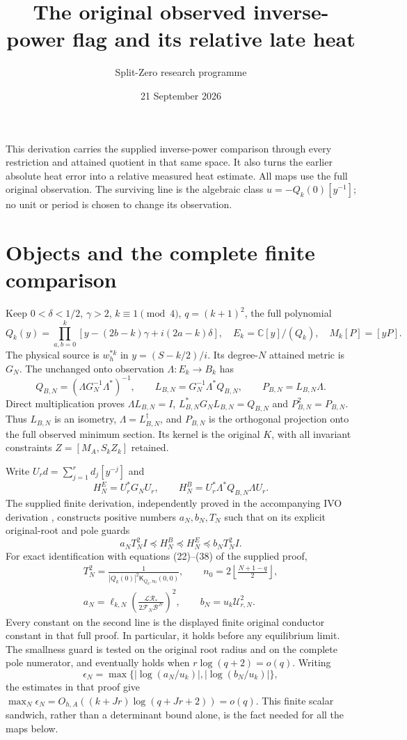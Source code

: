 \documentclass[11pt]{article}
\title{The original observed inverse-power flag and its relative late heat}
\author{Split-Zero research programme}\date{21 September 2026}
\begin{document}
\maketitle
This derivation carries the supplied inverse-power comparison through
every restriction and attained quotient in that same space. It also
turns the earlier absolute heat error into a relative measured heat
estimate. All maps use the full original observation. The surviving
line is the algebraic class $u=-Q_k(0)[y^{-1}]$; no unit or period is
chosen to change its observation.

\section{Objects and the complete finite comparison}
Keep $0<\delta<1/2$, $\gamma>2$, $k\equiv1\pmod4$,
$q=(k+1)^2$, the full polynomial
\[
Q_k(y)=\prod_{a,b=0}^{k}
[y-(2b-k)\gamma+i(2a-k)\delta],
\quad E_k=\mathbb C[y]/(Q_k),
\quad M_k[P]=[yP].
\]
The physical source is $w_h^{*k}$ in $y=(S-k/2)/i$.
Its degree-$N$ attained metric is $G_N$.
The unchanged onto observation $\Lambda:E_k\to B_k$ has
\[
Q_{B,N}=(\Lambda G_N^{-1}\Lambda^*)^{-1},\qquad
L_{B,N}=G_N^{-1}\Lambda^*Q_{B,N},\qquad
P_{B,N}=L_{B,N}\Lambda.
\tag{IFH1}
\]
Direct multiplication proves $\Lambda L_{B,N}=I$,
$L_{B,N}^*G_NL_{B,N}=Q_{B,N}$ and $P_{B,N}^2=P_{B,N}$.
Thus $L_{B,N}$ is an isometry, $\Lambda=L_{B,N}^\dagger$,
and $P_{B,N}$ is the orthogonal projection onto the full observed
minimum section. Its kernel is the original $K$, with all invariant
constraints $Z=[M_A,S_kZ_k]$ retained.

Write $U_rd=\sum_{j=1}^rd_j[y^{-j}]$ and
\[
H^E_N=U_r^*G_NU_r,\qquad
H^B_N=U_r^*\Lambda^*Q_{B,N}\Lambda U_r.
\]
The supplied finite derivation, independently proved in the accompanying
IVO derivation \cite{IVO}, constructs positive numbers $a_N,b_N,T_N$
such that on its explicit original-root and pole guards
\[
a_N T_N^2I\preceq H^B_N\preceq H^E_N
\preceq b_N T_N^2I .
\tag{IFH2}
\]
For exact identification with equations (22)--(38) of the supplied proof,
\[
\begin{gathered}
T_N^2=\frac1{|Q_k(0)|^2\mathsf K_{Q_k,n_0}(0,0)},\qquad
n_0=2\left\lfloor\frac{N+1-q}{2}\right\rfloor,\\
a_N=\ell_{k,N}
 \left(\frac{\mathcal L\mathcal R_*}
 {2\mathcal F_N\mathcal B^{Jr}}\right)^2,\qquad
b_N=u_k\mathcal U_{r,N}^2 .
\end{gathered}\tag{IFH3}
\]
Every constant on the second line is the displayed finite original
conductor constant in that full proof. In particular, it holds before
any equilibrium limit. The smallness guard is tested on the original
root radius and on the complete pole numerator, and eventually holds
when $r\log(q+2)=o(q)$.
Writing
\[
\epsilon_N=\max\{|\log(a_N/u_k)|,|\log(b_N/u_k)|\},
\]
the estimates in that proof give
$\max_N\epsilon_N=O_{h,A}((k+Jr)\log(q+Jr+2))=o(q)$.
This finite scalar sandwich, rather than a determinant bound alone,
is the fact needed for all the maps below.
\end{document}

